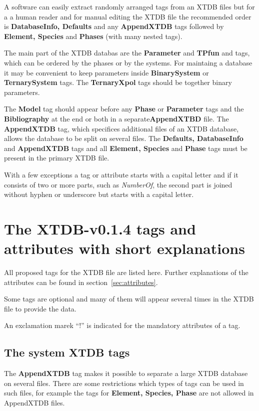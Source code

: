 \documentclass{article}
\begin{document}
A software can easily extract randomly arranged tags from an XTDB
files but for a a human reader and for manual editing the XTDB file
the recommended order is {\bf DatabaseInfo, Defaults} and any {\bf
  AppendXTDB} tags followed by {\bf Element, Species} and {\bf Phases}
(with many nested tags).

The main part of the XTDB databas are the {\bf Parameter} and {\bf
  TPfun} and tags, which can be ordered by the phases or by the
systems.  For maintaing a database it may be convenient to keep
parameters inside {\bf BinarySystem} or {\bf TernarySystem} tags.  The
{\bf TernaryXpol} tags should be together binary parameters.

The {\bf Model} tag should appear before any {\bf Phase} or {\bf
  Parameter} tags and the {\bf Bibliography} at the end or both in a
separate{\bf AppendXTBD} file.  The {\bf AppendXTDB} tag, which
specifices additional files of an XTDB database, allows the database to
be split on several files.  The {\bf Defaults, DatabaseInfo} and {\bf
  AppendXTDB} tags and all {\bf Element, Species} and {\bf Phase} tags
must be present in the primary XTDB file.

With a few exceptions a tag or attribute starts with a capital letter
and if it consists of two or more parts, such as {\em NumberOf}, the
second part is joined without hyphen or underscore but starts with a
capital letter. 

\newpage

\section{The XTDB-v0.1.4 tags and attributes with short explanations}\label{sec:tags}

All proposed tags for the XTDB file are listed here. Further
explanations of the attributes can be found in
section~\ref{sec:attributes}.

Some tags are optional and many of them will appear several times in
the XTDB file to provide the data.

An exclamation marek ``!'' is indicated for the mandatory attributes of a tag.

\subsection{The system XTDB tags}\label{sec:first}

The {\bf AppendXTDB} tag makes it possible to separate a large XTDB
database on several files.  There are some restrictions which types of
tags can be used in such files, for example the tags for {\bf Element,
  Species, Phase} are not allowed in AppendXTDB files.
\end{document}
